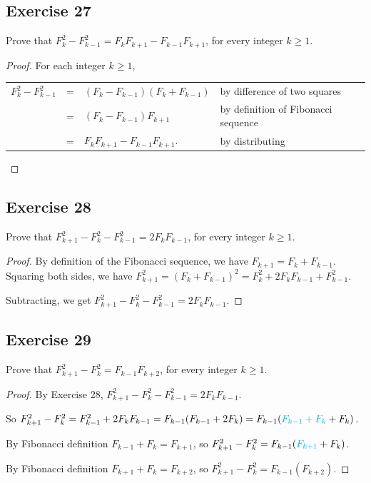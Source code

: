 \documentclass[14pt]{extarticle}
\newcommand{\cy}{\color{cyan}}
\begin{document}
\subsection{Exercise 27}
Prove that $F_k^2 - F_{k - 1}^2 = F_k F_{k + 1} - F_{k - 1}F_{k + 1}$, for every integer $k \geq 1$.

\begin{proof}
For each integer $k \geq 1$,

\begin{tabular}{rcll}
$F_k^2 - F_{k-1}^2$ & = & $(F_k - F_{k-1})(F_k + F_{k-1})$ & {\cy by difference of two squares} \\
& = & $(F_k - F_{k-1})F_{k+1}$ & {\cy by definition of Fibonacci sequence} \\
& = & $F_k F_{k+1} - F_{k-1} F_{k+1}$. & {\cy by distributing} 
\end{tabular}
\end{proof}

\subsection{Exercise 28}
Prove that $F_{k + 1}^2 - F_k^2 - F_{k - 1}^2 = 2F_kF_{k - 1}$, for every integer $k \geq 1$.

\begin{proof}
By definition of the Fibonacci sequence, we have $F_{k+1} = F_k + F_{k-1}$. Squaring both sides, we have
\(F_{k+1}^2 = (F_k + F_{k-1})^2 = F_k^2 + 2F_k F_{k-1} + F_{k-1}^2\).

Subtracting, we get \(F_{k+1}^2 - F_k^2 - F_{k-1}^2 = 2F_k F_{k-1}\).
\end{proof}

\subsection{Exercise 29}
Prove that $F_{k + 1}^2 - F_k^2 = F_{k - 1}F_{k + 2}$, for every integer $k \geq 1$.

\begin{proof}
By Exercise 28, $F_{k+1}^2 - F_k^2 - F_{k-1}^2 = 2F_k F_{k-1}$.

So $F_{k+1}^2 - F_k^2 = F_{k-1}^2 + 2F_k F_{k-1} = F_{k-1}(F_{k-1} + 2F_k) = F_{k-1}({\cy F_{k-1} + F_k} + F_k)$.

By Fibonacci definition $F_{k-1} + F_k = F_{k+1}$, so $F_{k+1}^2 - F_k^2 = F_{k-1}({\cy F_{k+1}} + F_k)$.

By Fibonacci definition $F_{k+1} + F_k = F_{k+2}$, so $F_{k+1}^2 - F_k^2 = F_{k-1}(F_{k+2})$.
\end{proof}
\end{document}
